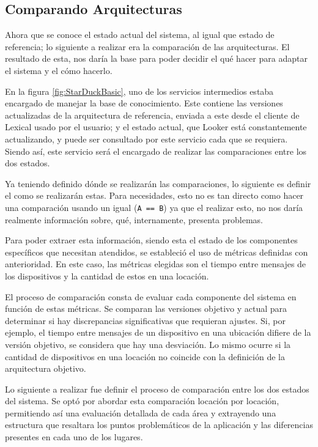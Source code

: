 
\subsection{Comparando Arquitecturas}

Ahora que se conoce el estado actual del sistema, al igual que estado de referencia; lo siguiente a realizar era la comparación de las arquitecturas. El resultado de esta, nos daría la base para poder decidir el qué hacer para adaptar el sistema y el cómo hacerlo.

En la figura \ref{fig:StarDuckBasic}, uno de los servicios intermedios estaba encargado de manejar la base de conocimiento. Este contiene las versiones actualizadas de la arquitectura de referencia, enviada a este desde el cliente de Lexical usado por el usuario; y el estado actual, que Looker está constantemente actualizando, y puede ser consultado por este servicio cada que se requiera. Siendo así, este servicio será el encargado de realizar las comparaciones entre los dos estados.

Ya teniendo definido dónde se realizarán las comparaciones, lo siguiente es definir el como se realizarán estas. Para necesidades, esto no es tan directo como hacer una comparación usando un igual (\texttt{A == B}) ya que el realizar esto, no nos daría realmente información sobre, qué, internamente, presenta problemas.

Para poder extraer esta información, siendo esta el estado de los componentes específicos que necesitan atendidos, se estableció el uso de métricas definidas con anterioridad. En este caso, las métricas elegidas son el tiempo entre mensajes de los dispositivos y la cantidad de estos en una locación.

El proceso de comparación consta de evaluar cada componente del sistema en función de estas métricas. Se comparan las versiones objetivo y actual para determinar si hay discrepancias significativas que requieran ajustes. Si, por ejemplo, el tiempo entre mensajes de un dispositivo en una ubicación difiere de la versión objetivo, se considera que hay una desviación. Lo mismo ocurre si la cantidad de dispositivos en una locación no coincide con la definición de la arquitectura objetivo.

Lo siguiente a realizar fue definir el proceso de comparación entre los dos estados del sistema. Se optó por abordar esta comparación locación por locación, permitiendo así una evaluación detallada de cada área y extrayendo una estructura que resaltara los puntos problemáticos de la aplicación y las diferencias presentes en cada uno de los lugares. 

